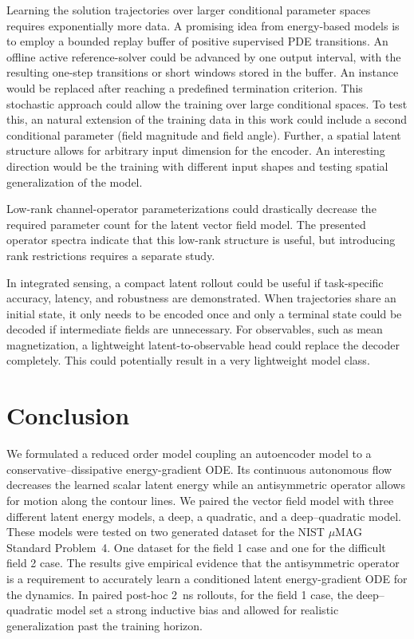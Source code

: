 \documentclass[a4paper,11pt]{article}
\begin{document}
\begin{table}[ht]
\begin{table}[ht]
Learning the solution trajectories over larger conditional parameter spaces requires exponentially more data. A promising idea from energy-based models is to employ a bounded replay buffer of positive supervised PDE transitions. An offline active reference-solver could be advanced by one output interval, with the resulting one-step transitions or short windows stored in the buffer. An instance would be replaced after reaching a predefined termination criterion. This stochastic approach could allow the training over large conditional spaces.
To test this, an natural extension of the training data in this work could include a second conditional parameter (field magnitude and field angle). Further, a spatial latent structure allows for arbitrary input dimension for the encoder. An interesting direction would be the training with different input shapes and testing spatial generalization of the model. 

Low-rank channel-operator parameterizations could drastically decrease the required parameter count for the latent vector field model. The presented operator spectra indicate that this low-rank structure is useful, but introducing rank restrictions requires a separate study.

In integrated sensing, a compact latent rollout could be useful if task-specific accuracy, latency, and robustness are demonstrated. When trajectories share an initial state, it only needs to be encoded once and only a terminal state could be decoded if intermediate fields are unnecessary. For observables, such as mean magnetization, a lightweight latent-to-observable head could replace the decoder completely. This could potentially result in a very lightweight model class.

\section{Conclusion}
We formulated a reduced order model coupling an autoencoder model to a conservative--dissipative energy-gradient ODE. Its continuous autonomous flow decreases the learned scalar latent energy while an antisymmetric operator allows for motion along the contour lines. We paired the vector field model with three different latent energy models, a deep, a quadratic, and a deep--quadratic model. These models were tested on two generated dataset for the NIST $\mu$MAG Standard Problem~4. One dataset for the field 1 case and one for the difficult field 2 case. The results give empirical evidence that the antisymmetric operator is a requirement to accurately learn a conditioned latent energy-gradient ODE for the dynamics. In paired post-hoc \SI{2}{ns} rollouts, for the field 1 case, the deep--quadratic model set a strong inductive bias and allowed for realistic generalization past the training horizon.\\


\end{table}
\end{table}
\end{document}
